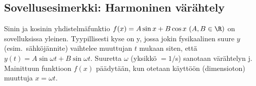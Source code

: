 \subsection{Sovellusesimerkki: Harmoninen värähtely}

Sinin ja kosinin yhdistelmäfunktio $f(x) = A \sin x + B \cos x\ (A,B\in\R)$ on sovelluksissa 
yleinen. Tyypillisesti kyse on 
%
 y, jossa jokin 
fysikaalinen suure $y$ (esim.\ sähköjännite) vaihtelee muuttujan $t$ mukaan siten, 
että $y(t) = A \sin \omega t + B \sin \omega t$. Suuretta $\omega$  (yksikkö $= 1/$s) sanotaan 
värähtelyn j. Mainittuun funktioon $f(x)$ päädytään, kun otetaan 
käyttöön (dimensioton) muuttuja $x=\omega t$.

